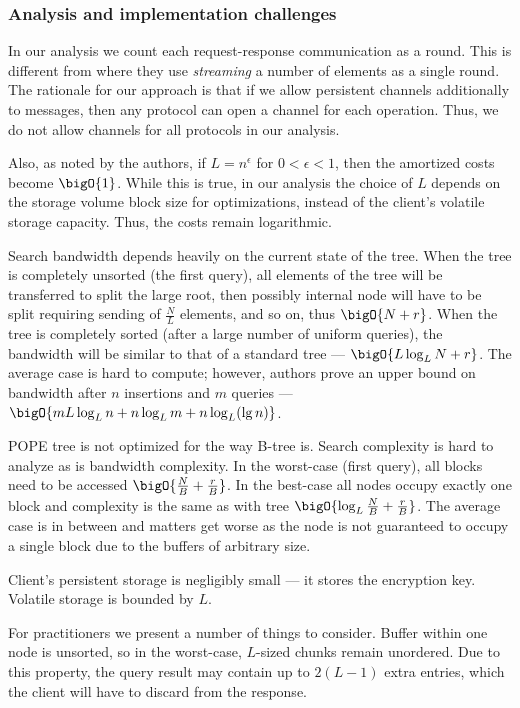 	\subsubsection{Analysis and implementation challenges}

		In our analysis we count each request-response communication as a round.
		This is different from \cite{pope} where they use \emph{streaming} a number of elements as a single round. %
		The rationale for our approach is that if we allow persistent channels additionally to messages, then any protocol can open a channel for each operation.
		Thus, we do not allow channels for all protocols in our analysis.

		Also, as noted by the authors, if $L = n^{\epsilon}$ for $0 < \epsilon < 1$, then the amortized costs become $\bigO{1}$.
		While this is true, in our analysis the choice of $L$ depends on the storage volume block size for {\IO} optimizations, instead of the client's volatile storage capacity.
		Thus, the costs remain logarithmic.

		Search bandwidth depends heavily on the current state of the tree.
		When the tree is completely unsorted (the first query), all elements of the tree will be transferred to split the large root, then possibly internal node will have to be split requiring sending of $\frac{N}{L}$ elements, and so on, thus $\bigO{N + r}$.
		When the tree is completely sorted (after a large number of uniform queries), the bandwidth will be similar to that of a standard {\BPlus} tree --- $\bigO{L \log_L N + r}$.
		The average case is hard to compute; however, authors prove an upper bound on bandwidth after $n$ insertions and $m$ queries --- $\bigO{m L \log_L n + n \log_L m + n \log_L (\lg n) }$.

		POPE tree is not optimized for {\IO} the way B-tree is.
		Search complexity is hard to analyze as is bandwidth complexity.
		In the worst-case (first query), all blocks need to be accessed $\bigO{\frac{N}{B} + \frac{r}{B}}$.
		In the best-case all nodes occupy exactly one block and {\IO} complexity is the same as with {\BPlus} tree $\bigO{\log_L \frac{N}{B} + \frac{r}{B}}$.
		The average case is in between and matters get worse as the node is not guaranteed to occupy a single block due to the buffers of arbitrary size.

		Client's persistent storage is negligibly small --- it stores the encryption key.
		Volatile storage is bounded by $L$.

		For practitioners we present a number of things to consider.
		Buffer within one node is unsorted, so in the worst-case, $L$-sized chunks remain unordered.
		Due to this property, the query result may contain up to $2 (L - 1)$ extra entries, which the client will have to discard from the response.

